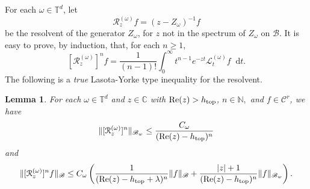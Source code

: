 \documentclass[11pt,letterpaper]{amsart}
\newcommand \cL {{\mathcal L}}
\newcommand \cR {{\mathcal R}}
\def\C{{\mathbb C}}
\newcommand \N {{ \mathbb N}}
\newcommand \T {{ \mathbb T}}
\newcommand \cB {{\mathscr B}}
\newcommand \bT {{\mathbb T}}
\newcommand \cC {{\mathscr{C}}}
\newcommand*{\diff}{\mathop{}\!\mathrm{d}}
\newcommand \re {{%
\operatorname{Re}
}}
\DeclareMathOperator{\topp}{top}
\newtheorem {lemma}[theorem]{Lemma}
\theoremstyle{definition}
\begin{document}
For each $\omega\in \T^d$, let \[\cR^{(\omega)}_z f= (z-Z_\omega)^{-1}f\] be the resolvent of the generator $Z_\omega$, for $z$ not in the spectrum of $Z_\omega$ on $\cB$. 
It is easy to prove, by induction, that, for each $n \ge 1$,
\begin{equation}\label{eq:R-formula}
[\cR_{z}^{(\omega)}]^n f=\frac{1}{(n-1)!}\int_0^\infty t^{n-1}e^{-zt}\cL^{(\omega)}_t f \diff t.
\end{equation}
The following is a {\it true} Lasota-Yorke type inequality for the resolvent. 

\begin{lemma}\label{lem:LY-R}
For each $\omega\in \bT^d$ and $z\in \C$ with $\re(z)>h_{\topp}$, $n\in \N,$ and $f\in \cC^r$, we have
\begin{equation}\label{eq:LY1_R}
\|[\cR_z^{(\omega)}]^n\|_{\cB_w}\le \frac{C_\omega}{(\re(z)-h_{\topp})^{n}}
\end{equation}
and
\begin{equation}\label{eq:LY2_R}
\|[\cR_z^{(\omega)}]^n f\|_{\cB}\le C_\omega \left(\frac{1}{ (\re(z)-h_{\topp}+\lambda)^{n}}\|f\|_{\cB}+\frac{|z|+1}{(\re(z)-h_{\topp})^n}\|f\|_{\cB_w}\right).
\end{equation}
\end{lemma}
\end{document}
